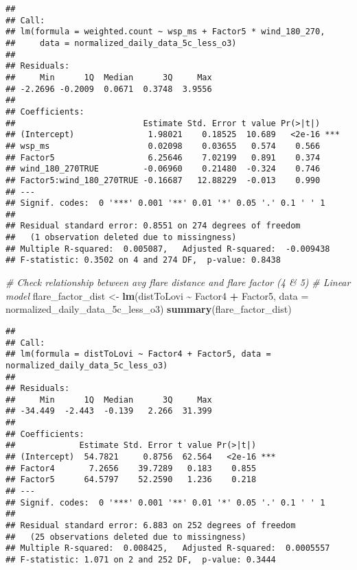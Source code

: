 \documentclass[
]{article}
\newenvironment{Shaded}{\begin{snugshade}}{\end{snugshade}}
\newcommand{\AttributeTok}[1]{\textcolor[rgb]{0.13,0.29,0.53}{#1}}
\newcommand{\CommentTok}[1]{\textcolor[rgb]{0.56,0.35,0.01}{\textit{#1}}}
\newcommand{\FunctionTok}[1]{\textcolor[rgb]{0.13,0.29,0.53}{\textbf{#1}}}
\newcommand{\NormalTok}[1]{#1}
\newcommand{\OtherTok}[1]{\textcolor[rgb]{0.56,0.35,0.01}{#1}}
\newcommand{\SpecialCharTok}[1]{\textcolor[rgb]{0.81,0.36,0.00}{\textbf{#1}}}
\begin{document}
\begin{verbatim}
## 
## Call:
## lm(formula = weighted.count ~ wsp_ms + Factor5 * wind_180_270, 
##     data = normalized_daily_data_5c_less_o3)
## 
## Residuals:
##     Min      1Q  Median      3Q     Max 
## -2.2696 -0.2009  0.0671  0.3748  3.9556 
## 
## Coefficients:
##                          Estimate Std. Error t value Pr(>|t|)    
## (Intercept)               1.98021    0.18525  10.689   <2e-16 ***
## wsp_ms                    0.02098    0.03655   0.574    0.566    
## Factor5                   6.25646    7.02199   0.891    0.374    
## wind_180_270TRUE         -0.06960    0.21480  -0.324    0.746    
## Factor5:wind_180_270TRUE -0.16687   12.88229  -0.013    0.990    
## ---
## Signif. codes:  0 '***' 0.001 '**' 0.01 '*' 0.05 '.' 0.1 ' ' 1
## 
## Residual standard error: 0.8551 on 274 degrees of freedom
##   (1 observation deleted due to missingness)
## Multiple R-squared:  0.005087,   Adjusted R-squared:  -0.009438 
## F-statistic: 0.3502 on 4 and 274 DF,  p-value: 0.8438
\end{verbatim}

\begin{Shaded}
\begin{Highlighting}[]
\CommentTok{\# Check relationship between avg flare distance and flare factor (4 \& 5)}
\CommentTok{\# Linear model}
\NormalTok{flare\_factor\_dist }\OtherTok{\textless{}{-}} \FunctionTok{lm}\NormalTok{(distToLovi }\SpecialCharTok{\textasciitilde{}}\NormalTok{ Factor4 }\SpecialCharTok{+}\NormalTok{ Factor5, }\AttributeTok{data =}\NormalTok{ normalized\_daily\_data\_5c\_less\_o3)}
\FunctionTok{summary}\NormalTok{(flare\_factor\_dist)}
\end{Highlighting}
\end{Shaded}

\begin{verbatim}
## 
## Call:
## lm(formula = distToLovi ~ Factor4 + Factor5, data = normalized_daily_data_5c_less_o3)
## 
## Residuals:
##     Min      1Q  Median      3Q     Max 
## -34.449  -2.443  -0.139   2.266  31.399 
## 
## Coefficients:
##             Estimate Std. Error t value Pr(>|t|)    
## (Intercept)  54.7821     0.8756  62.564   <2e-16 ***
## Factor4       7.2656    39.7289   0.183    0.855    
## Factor5      64.5797    52.2590   1.236    0.218    
## ---
## Signif. codes:  0 '***' 0.001 '**' 0.01 '*' 0.05 '.' 0.1 ' ' 1
## 
## Residual standard error: 6.883 on 252 degrees of freedom
##   (25 observations deleted due to missingness)
## Multiple R-squared:  0.008425,   Adjusted R-squared:  0.0005557 
## F-statistic: 1.071 on 2 and 252 DF,  p-value: 0.3444
\end{verbatim}
\end{document}
